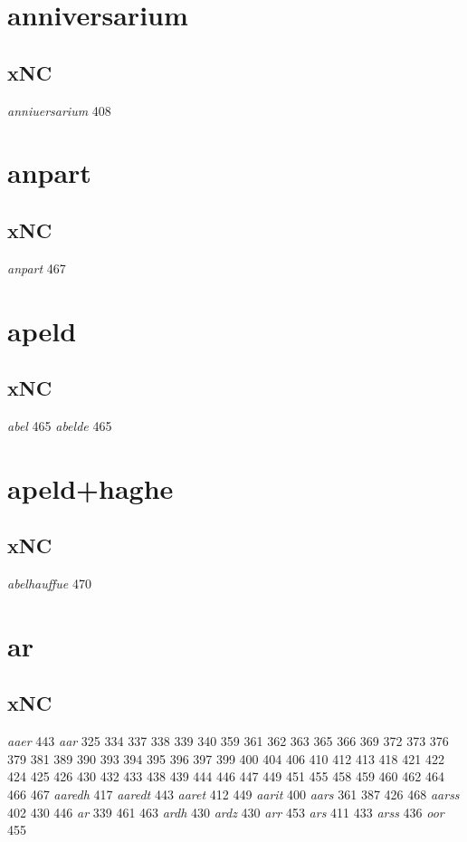 \documentclass[a4paper,twocolumn]{article}
\begin{document}
\section{anniversarium}
\label{sec:orge26ed5a}
\subsection{xNC}
\label{sec:orgfb7a988}
\emph{anniuersarium} 408 
\section{anpart}
\label{sec:org1dfac49}
\subsection{xNC}
\label{sec:org2f811e4}
\emph{anpart} 467 
\section{apeld}
\label{sec:org2cee4c5}
\subsection{xNC}
\label{sec:org90a8c33}
\emph{abel} 465 \emph{abelde} 465 
\section{apeld+haghe}
\label{sec:org2fa1c0b}
\subsection{xNC}
\label{sec:org83aefaa}
\emph{abelhauffue} 470 
\section{ar}
\label{sec:org0b88608}
\subsection{xNC}
\label{sec:org398d5c6}
\emph{aaer} 443 \emph{aar} 325 334 337 338 339 340 359 361 362 363 365 366 369 372 373 376 379 381 389 390 393 394 395 396 397 399 400 404 406 410 412 413 418 421 422 424 425 426 430 432 433 438 439 444 446 447 449 451 455 458 459 460 462 464 466 467 \emph{aaredh} 417 \emph{aaredt} 443 \emph{aaret} 412 449 \emph{aarit} 400 \emph{aars} 361 387 426 468 \emph{aarss} 402 430 446 \emph{ar} 339 461 463 \emph{ardh} 430 \emph{ardz} 430 \emph{arr} 453 \emph{ars} 411 433 \emph{arss} 436 \emph{oor} 455 
\end{document}
